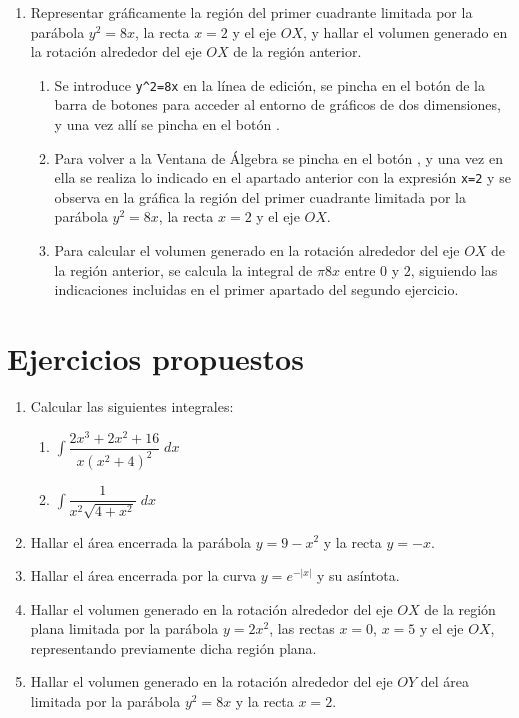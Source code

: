 \begin{enumerate}[leftmargin=*]
\item  Representar gráficamente la región del primer cuadrante limitada por la parábola $y^{2}=8x$, la recta $x=2$ y el eje $OX$, y hallar
el volumen generado en la rotación alrededor del eje $OX$ de la región anterior.
\begin{indicacion}
\begin{enumerate}
\item Se introduce \verb|y^2=8x| en la línea de edición, se pincha en el botón  de la barra de botones para acceder
al entorno de gráficos de dos dimensiones, y una vez allí se pincha en el botón .
\item Para volver a la Ventana de Álgebra se pincha en el botón , y una vez en ella se realiza lo
indicado en el apartado anterior con la expresión \verb|x=2| y se observa en la gráfica la región del primer cuadrante limitada por la
parábola $y^{2}=8x$, la recta $x=2$ y el eje $OX$.
\item Para calcular el volumen generado en la rotación alrededor del eje $OX$ de la región anterior, se calcula la integral de $\pi8x$ entre
$0$ y $2$, siguiendo las indicaciones incluidas en el primer apartado del segundo ejercicio.
\end{enumerate}
\end{indicacion}

\end{enumerate}


\section{Ejercicios propuestos}
\begin{enumerate}[leftmargin=*]
\item Calcular las siguientes integrales:
\begin{enumerate}
\item $ \int{\dfrac{2x^{3}+2x^{2}+16}{x(x^{2}+4)^{2}}\;dx}$
\item $ \int{\dfrac{1}{x^{2}\sqrt{4+x^{2}}}\;dx}$
\end{enumerate}

\item Hallar el área encerrada la parábola $y=9-x^{2}$ y la recta $y=-x$.

\item Hallar el área encerrada por la curva $y=e^{-|x|}$ y su asíntota.

\item Hallar el volumen generado en la rotación alrededor del eje $OX$ de la región plana limitada por la parábola $y=2x^{2}$, las rectas
$x=0$, $x=5$ y el eje $OX$, representando previamente dicha región plana.

\item Hallar el volumen generado en la rotación alrededor del eje $OY$ del área limitada por la parábola $y^{2}=8x$ y la recta $x=2$.

\end{enumerate}
